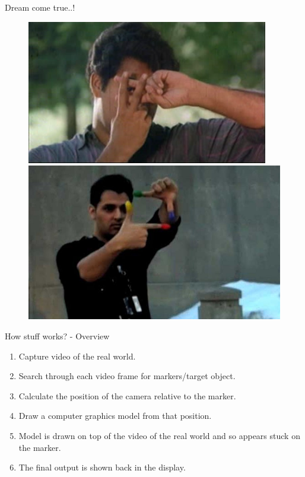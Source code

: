 \documentclass{beamer}
\begin{document}
\begin{frame}{Dream come true..!}
	\begin{figure}
	    \pause \includegraphics[scale=.3878]{mohanlal.png}
	    \pause \includegraphics[scale=.20]{pranavclick.jpg}
	\end{figure}
\end{frame}


\begin{frame}{How stuff works? - Overview}
	\begin{enumerate}
		\item Capture video of the real world.
		\item Search through each video frame for markers/target object.
		\item Calculate the position of the camera relative to the marker.
		\item Draw a  computer graphics model from that position.
		\item Model is drawn on top of the video of the real world and so appears stuck on the marker.
		\item The final output is shown back in the display.
	\end{enumerate}
\end{frame}
\end{document}
